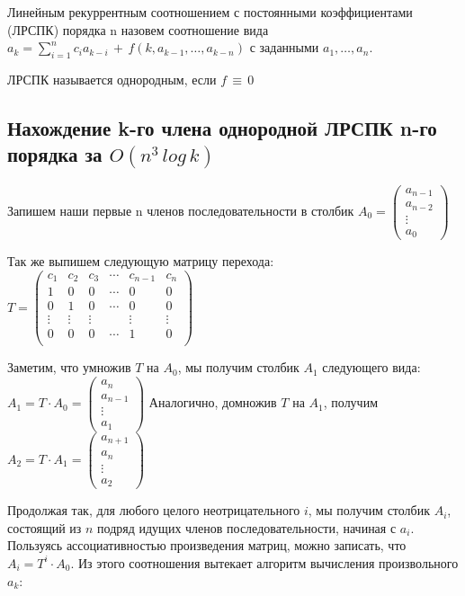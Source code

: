 \Def Линейным рекуррентным соотношением с постоянными коэффициентами (ЛРСПК) порядка n назовем соотношение вида $a_k = \sum\limits_{i=1}^n c_{i} a_{k-i}\,+\,f(k,a_{k-1},\dots,a_{k-n})$ с заданными $a_1, \dots , a_n$.

ЛРСПК называется однородным, если $f\, \equiv \,0$

\subsection*{Нахождение k-го члена однородной ЛРСПК n-го порядка за $O(n^3\,log\,k)$}

Запишем наши первые n членов последовательности в столбик $A_0 = \begin{pmatrix}
a_{n - 1}\\
a_{n - 2}\\
\vdots \\
a_0
\end{pmatrix}$

Так же выпишем следующую матрицу перехода:
$T = \begin{pmatrix}
c_1 & c_2 & c_3 & \cdots & c_{n - 1} & c_n\\
1 & 0 & 0 & \cdots & 0 & 0\\
0 & 1 & 0 & \cdots & 0 & 0\\
\vdots & \vdots & \vdots & ~ & \vdots & \vdots \\
0 & 0 & 0 & \cdots & 1 & 0\\
\end{pmatrix}$

Заметим, что умножив $T$ на $A_0$, мы получим столбик $A_1$ следующего вида: 
$A_1 = T \cdot A_0 = \begin{pmatrix}
a_{n}\\
a_{n - 1}\\
\vdots \\
a_1
\end{pmatrix}$
Аналогично, домножив $T$ на $A_1$, получим 
$A_2 = T \cdot A_1 = \begin{pmatrix}
a_{n + 1}\\
a_{n}\\
\vdots \\
a_2
\end{pmatrix}$

Продолжая так, для любого целого неотрицательного $i$, мы получим столбик $A_i$, состоящий из $n$ подряд идущих членов последовательности, начиная с $a_i$. Пользуясь ассоциативностью произведения матриц, можно записать, что $A_i = T^i \cdot A_0$. Из этого соотношения вытекает алгоритм вычисления произвольного $a_k$:

